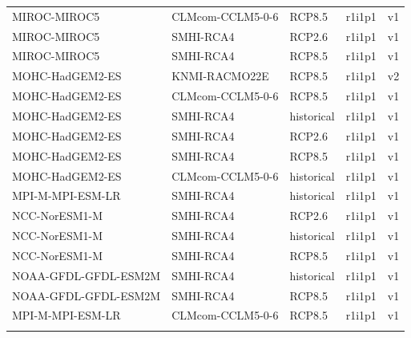 \documentclass[hess, manuscript]{copernicus}
\begin{document}
\begin{table}[!htbp]
\begin{tabular}{@{\extracolsep{5pt}} lllll}
 MIROC-MIROC5&CLMcom-CCLM5-0-6&RCP8.5&r1i1p1&v1 \\ 
 MIROC-MIROC5&SMHI-RCA4&RCP2.6&r1i1p1&v1 \\ 
 MIROC-MIROC5&SMHI-RCA4&RCP8.5&r1i1p1&v1 \\ 
 MOHC-HadGEM2-ES&KNMI-RACMO22E&RCP8.5&r1i1p1&v2 \\ 
 MOHC-HadGEM2-ES&CLMcom-CCLM5-0-6&RCP8.5&r1i1p1&v1 \\ 
 MOHC-HadGEM2-ES&SMHI-RCA4&historical&r1i1p1&v1 \\ 
 MOHC-HadGEM2-ES&SMHI-RCA4&RCP2.6&r1i1p1&v1 \\ 
 MOHC-HadGEM2-ES&SMHI-RCA4&RCP8.5&r1i1p1&v1 \\ 
 MOHC-HadGEM2-ES&CLMcom-CCLM5-0-6&historical&r1i1p1&v1 \\ 
 MPI-M-MPI-ESM-LR&SMHI-RCA4&historical&r1i1p1&v1 \\ 
 NCC-NorESM1-M&SMHI-RCA4&RCP2.6&r1i1p1&v1 \\ 
 NCC-NorESM1-M&SMHI-RCA4&historical&r1i1p1&v1 \\ 
 NCC-NorESM1-M&SMHI-RCA4&RCP8.5&r1i1p1&v1 \\ 
 NOAA-GFDL-GFDL-ESM2M&SMHI-RCA4&historical&r1i1p1&v1 \\ 
 NOAA-GFDL-GFDL-ESM2M&SMHI-RCA4&RCP8.5&r1i1p1&v1 \\ 
MPI-M-MPI-ESM-LR&CLMcom-CCLM5-0-6&RCP8.5&r1i1p1&v1 \\ 

\hline \\[-1.8ex] 
\end{tabular} 
\end{table}
\end{document}
